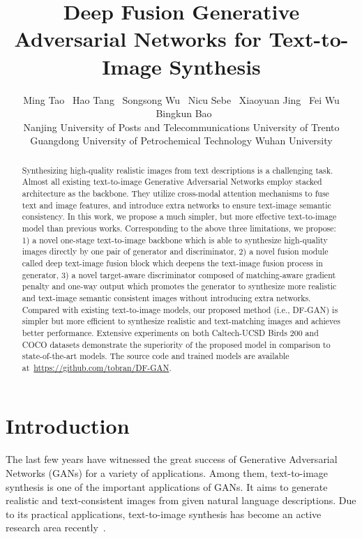\documentclass[10pt,twocolumn,letterpaper]{article}
\begin{document}
\title{Deep Fusion Generative Adversarial Networks for Text-to-Image Synthesis}

\author{Ming Tao \ Hao Tang \ Songsong Wu \ Nicu Sebe \  Xiaoyuan Jing \ Fei Wu \ Bingkun Bao \\
Nanjing University of Posts and Telecommunications\quad
	University of Trento \\
	Guangdong University of Petrochemical Technology \quad
	Wuhan University
}


\maketitle


\begin{abstract}
Synthesizing high-quality realistic images from text descriptions is a challenging task. 
Almost all existing text-to-image Generative Adversarial Networks employ stacked architecture as the backbone.
They utilize cross-modal attention mechanisms to fuse text and image features, and introduce extra networks to ensure text-image semantic consistency.
In this work, we propose a much simpler, but more effective text-to-image model than previous works.
Corresponding to the above three limitations, we propose: 
1) a novel one-stage text-to-image backbone which is able to synthesize high-quality images directly by one pair of generator and discriminator,
2) a novel fusion module called deep text-image fusion block which deepens the text-image fusion process in generator,
3) a novel target-aware discriminator composed of matching-aware gradient penalty and one-way output which promotes the generator to synthesize more realistic and text-image semantic consistent images without introducing extra networks.
Compared with existing text-to-image models, our proposed method (i.e., DF-GAN) is simpler but more efficient to synthesize realistic and text-matching images and achieves better performance.
Extensive experiments on both Caltech-UCSD Birds 200 and COCO datasets demonstrate the superiority of the proposed model in comparison to state-of-the-art models. The source code and trained models are available at~\url{https://github.com/tobran/DF-GAN}.
\end{abstract}

\section{Introduction}
The last few years have witnessed the great success of Generative Adversarial Networks (GANs) \cite{goodfellow2014generative} for a variety of applications. 
Among them, text-to-image synthesis is one of the important applications of GANs. It aims to generate realistic and text-consistent images from given natural language descriptions. Due to its practical applications, text-to-image synthesis has become an active research area recently~\cite{yuan2019ckd, hong2018inferring, li2020exploring, gou2020segattngan, cheng2020rifegan, ramesh2021zero}.
\end{document}
